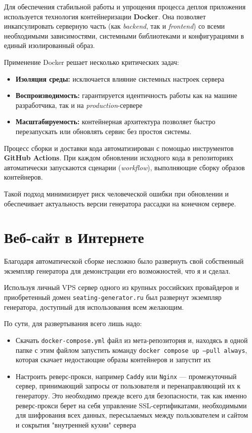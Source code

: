 \documentclass[12pt,a4paper]{extarticle} %
\begin{document}
	Для обеспечения стабильной работы и упрощения процесса деплоя приложения используется технология контейнеризации \textbf{Docker}. Она позволяет инкапсулировать серверную часть (как \textit{backend}, так и \textit{frontend}) со всеми необходимыми зависимостями, системными библиотеками и конфигурациями в единый изолированный образ.
	
	Применение Docker решает несколько критических задач:
	\begin{itemize}
		\item \textbf{Изоляция среды:} исключается влияние системных настроек сервера
		\item \textbf{Воспроизводимость:} гарантируется идентичность работы как на машине разработчика, так и на \textit{production}-сервере
		\item \textbf{Масштабируемость:} контейнерная архитектура позволяет быстро перезапускать или обновлять сервис без простоя системы.
	\end{itemize}
	
	Процесс сборки и доставки кода автоматизирован с помощью инструментов \textbf{GitHub Actions}. При каждом обновлении исходного кода в репозиториях автоматически запускаются сценарии (\textit{workflow}), выполняющие сборку образов контейнеров.
	
	Такой подход минимизирует риск человеческой ошибки при обновлении и обеспечивает актуальность версии генератора рассадки на конечном сервере.
	
	\section{Веб-сайт в Интернете}
	Благодаря автоматической сборке несложно было развернуть свой собственный экземпляр генератора для демонстрации его возможностей, что я и сделал.
	
	Используя личный VPS сервер одного из крупных российских провайдеров и приобретенный домен \texttt{seating-generator.ru} был развернут экземпляр генератора, доступный для использования всем желающим.
	
	По сути, для развертывания всего лишь надо:
	
	\begin{itemize}
		\item Скачать \texttt{docker-compose.yml} файл из мета-репозитория \cite{github_repo} и, находясь в одной папке с этим файлом запустить команду \texttt{docker compose up --pull always}, которая скачает недостающие образы контейнеров и запустит их
		\item Настроить реверс-прокси, например \texttt{Caddy} или \texttt{Nginx} --- промежуточный сервер, принимающий запросы от пользователя и перенаправляющий их к генератору. Это необходимо прежде всего для безопасности, так как именно реверс-прокси берет на себя управление SSL-сертификатами, необходимыми для шифрования всех данных, пересылаемых между пользователем и сайтом и сокрытия "внутренней кухни" сервера
	\end{itemize}
	
\end{document}
